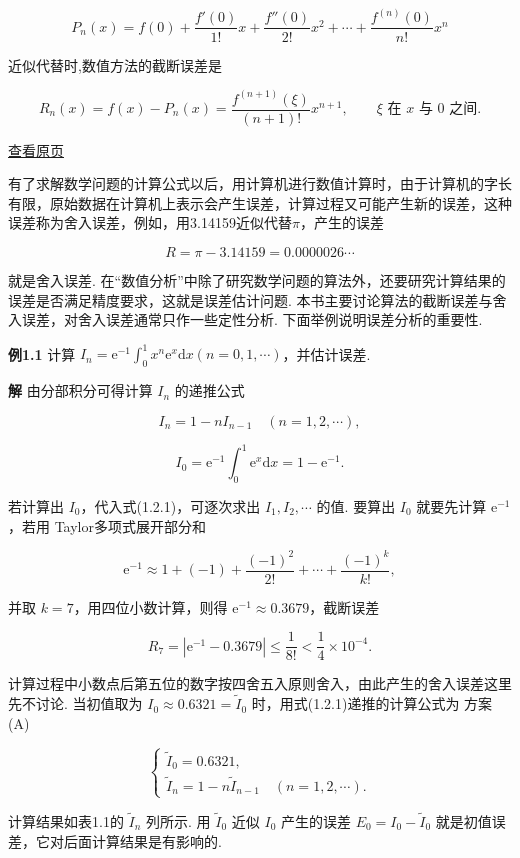 \documentclass[
  10pt,
  fontset=fandol]{ctexart}
\begin{document}
\[
P_n(x)=f(0)+\frac{f'(0)}{1!}x+\frac{f''(0)}{2!}x^2+\cdots+\frac{f^{(n)}(0)}{n!}x^n
\]

近似代替时,数值方法的截断误差是

\[
R_n(x)=f(x)-P_n(x)=\frac{f^{(n+1)}(\xi)}{(n+1)!}x^{n+1},\qquad \xi\text{ 在 }x\text{ 与 }0\text{ 之间}.
\]

\href{../../source-images/pdf-016.jpeg}{查看原页}

有了求解数学问题的计算公式以后，用计算机进行数值计算时，由于计算机的字长有限，原始数据在计算机上表示会产生误差，计算过程又可能产生新的误差，这种误差称为舍入误差，例如，用3.14159近似代替\(\pi\)，产生的误差

\[
R = \pi - 3.14159 = 0.0000026\cdots
\]

就是舍入误差. 在``数值分析''中除了研究数学问题的算法外，还要研究计算结果的误差是否满足精度要求，这就是误差估计问题. 本书主要讨论算法的截断误差与舍入误差，对舍入误差通常只作一些定性分析. 下面举例说明误差分析的重要性.

\textbf{例1.1} 计算 \(I_n = \mathrm{e}^{-1} \int_{0}^{1} x^n \mathrm{e}^{x} \mathrm{d}x (n = 0,1,\cdots)\)，并估计误差.

\textbf{解} 由分部积分可得计算 \(I_n\) 的递推公式

\[
I_n = 1 - n I_{n-1} \quad (n = 1,2,\cdots), \tag{1.2.1}
\]

\[
I_0 = \mathrm{e}^{-1} \int_{0}^{1} \mathrm{e}^{x} \mathrm{d}x = 1 - \mathrm{e}^{-1}.
\]

若计算出 \(I_0\)，代入式(1.2.1)，可逐次求出 \(I_1, I_2, \cdots\) 的值. 要算出 \(I_0\) 就要先计算 \(\mathrm{e}^{-1}\)，若用 Taylor多项式展开部分和

\[
\mathrm{e}^{-1} \approx 1 + (-1) + \frac{(-1)^2}{2!} + \cdots + \frac{(-1)^k}{k!},
\]

并取 \(k=7\)，用四位小数计算，则得 \(\mathrm{e}^{-1} \approx 0.3679\)，截断误差

\[
R_7 = |\mathrm{e}^{-1} - 0.3679| \leqslant \frac{1}{8!} < \frac{1}{4} \times 10^{-4}.
\]

计算过程中小数点后第五位的数字按四舍五入原则舍入，由此产生的舍入误差这里先不讨论. 当初值取为 \(I_0 \approx 0.6321 = \tilde{I}_0\) 时，用式(1.2.1)递推的计算公式为 方案(A)

\[
\begin{cases}
\tilde{I}_0 = 0.6321, \\
\tilde{I}_n = 1 - n \tilde{I}_{n-1} \quad (n = 1,2,\cdots).
\end{cases}
\]

计算结果如表1.1的 \(\tilde{I}_n\) 列所示. 用 \(\tilde{I}_0\) 近似 \(I_0\) 产生的误差 \(E_0 = I_0 - \tilde{I}_0\) 就是初值误差，它对后面计算结果是有影响的.
\end{document}

